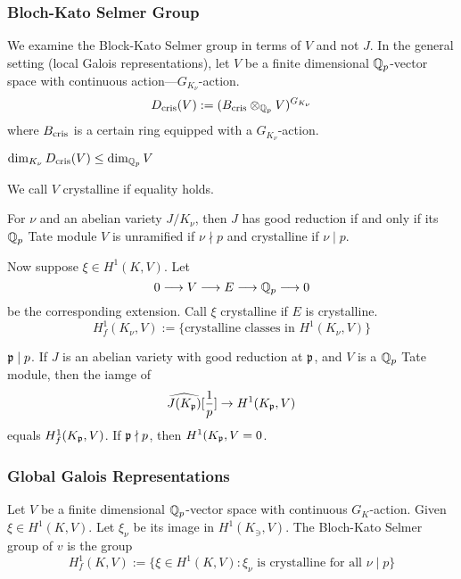 \subsubsection{Bloch-Kato Selmer Group}

We examine the Block-Kato Selmer group in terms of $V$ and not $J$. In the general setting (local Galois representations), let $V$ be a finite dimensional $\mathbb{Q}_p$-vector space with continuous action---$G_{K_\nu}$-action. 
	\[
	D_{\text{cris}}(V):= (B_{\text{cris}} \otimes_{\mathbb{Q}_p} V)^{G_{K_\nu}}
	\]
where $B_{\text{cris}}$ is a certain ring equipped with a $G_{K_\nu}$-action. 


\begin{rem}
$\dim_{K_\nu} D_{\text{cris}}(V) \leq \dim_{\mathbb{Q}_p} V$
\end{rem}


\begin{dfn}[Crystalline]
We call $V$ crystalline if equality holds. 
\end{dfn}


\begin{rem}
For $\nu$ and an abelian variety $J/K_\nu$, then $J$ has good reduction if and only if its $\mathbb{Q}_p$ Tate module $V$ is unramified if $\nu \nmid p$ and crystalline if $\nu \mid p$. 
\end{rem}


Now suppose $\xi \in H^1(K,V)$. Let
	\[
	0 \stackrel{}{\longrightarrow} V \stackrel{}{\longrightarrow} E \stackrel{}{\longrightarrow} \mathbb{Q}_p \stackrel{}{\longrightarrow} 0
	\]
be the corresponding extension. Call $\xi$ crystalline if $E$ is crystalline. 
	\[
	H_f^1(K_\nu,V):= \{ \text{crystalline classes in } H^1(K_\nu,V) \}
	\]


\begin{rem}
$\mathfrak{p} \mid p$. If $J$ is an abelian variety with good reduction at $\mathfrak{p}$, and $V$ is a $\mathbb{Q}_p$ Tate module, then the iamge of
	\[
	\widehat{J(K_{\mathfrak{p}})}[\frac{1}{p}] \to H^1(K_{\mathfrak{p}},V)
	\]
equals $H_f^1(K_{\mathfrak{p}},V)$. If $\mathfrak{p} \nmid p$, then $H^1(K_{\mathfrak{p}},V= 0$.
\end{rem}



\subsubsection{Global Galois Representations}

Let $V$ be a finite dimensional $\mathbb{Q}_p$-vector space with continuous $G_K$-action. Given $\xi \in H^1(K,V)$. Let $\xi_\nu$ be its image in $H^1(K_\ni,V)$. The Bloch-Kato Selmer group of $v$ is the group
	\[
	H_f^1(K,V):= \{ \xi \in H^1(K,V) \colon \xi_\nu \text{ is crystalline for all } \nu \mid p \}
	\]


